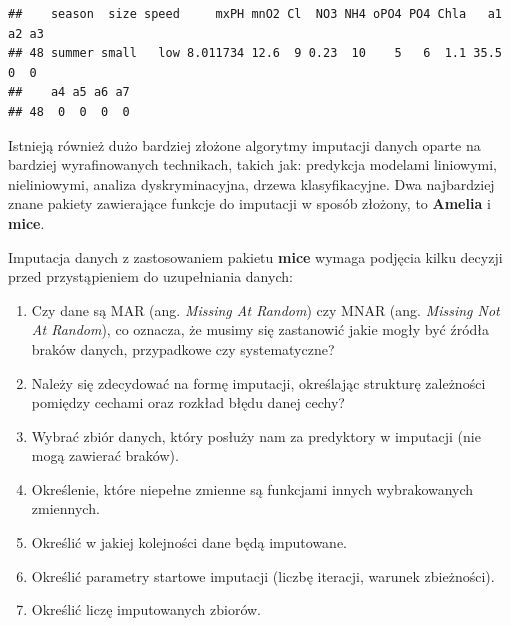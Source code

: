 \documentclass[]{book}
\newenvironment{Shaded}{\begin{snugshade}}{\end{snugshade}}
\newcommand{\DataTypeTok}[1]{\textcolor[rgb]{0.13,0.29,0.53}{#1}}
\newcommand{\DecValTok}[1]{\textcolor[rgb]{0.00,0.00,0.81}{#1}}
\newcommand{\KeywordTok}[1]{\textcolor[rgb]{0.13,0.29,0.53}{\textbf{#1}}}
\newcommand{\NormalTok}[1]{#1}
\newcommand{\OperatorTok}[1]{\textcolor[rgb]{0.81,0.36,0.00}{\textbf{#1}}}
\newcommand{\StringTok}[1]{\textcolor[rgb]{0.31,0.60,0.02}{#1}}
\providecommand{\tightlist}{%
  \setlength{\itemsep}{0pt}\setlength{\parskip}{0pt}}
\theoremstyle{plain}
\theoremstyle{definition}
\theoremstyle{definition}
\theoremstyle{definition}
\theoremstyle{definition}
\theoremstyle{remark}
\begin{document}
\begin{Shaded}
\end{Shaded}

\begin{verbatim}
##    season  size speed     mxPH mnO2 Cl  NO3 NH4 oPO4 PO4 Chla   a1 a2 a3
## 48 summer small   low 8.011734 12.6  9 0.23  10    5   6  1.1 35.5  0  0
##    a4 a5 a6 a7
## 48  0  0  0  0
\end{verbatim}

Istnieją również dużo bardziej złożone algorytmy imputacji danych oparte na bardziej wyrafinowanych technikach, takich jak: predykcja modelami liniowymi, nieliniowymi, analiza dyskryminacyjna, drzewa klasyfikacyjne. Dwa najbardziej znane pakiety zawierające funkcje do imputacji w sposób złożony, to \textbf{Amelia} i \textbf{mice}.

Imputacja danych z zastosowaniem pakietu \textbf{mice} wymaga podjęcia kilku decyzji przed przystąpieniem do uzupełniania danych:

\begin{enumerate}
\def\labelenumi{\arabic{enumi}.}
\tightlist
\item
  Czy dane są MAR (ang. \emph{Missing At Random}) czy MNAR (ang. \emph{Missing Not At Random}), co oznacza, że musimy się zastanowić jakie mogły być źródła braków danych, przypadkowe czy systematyczne?
\item
  Należy się zdecydować na formę imputacji, określając strukturę zależności pomiędzy cechami oraz rozkład błędu danej cechy?
\item
  Wybrać zbiór danych, który posłuży nam za predyktory w imputacji (nie mogą zawierać braków).
\item
  Określenie, które niepełne zmienne są funkcjami innych wybrakowanych zmiennych.
\item
  Określić w jakiej kolejności dane będą imputowane.
\item
  Określić parametry startowe imputacji (liczbę iteracji, warunek zbieżności).
\item
  Określić liczę imputowanych zbiorów.
\end{enumerate}
\end{document}

